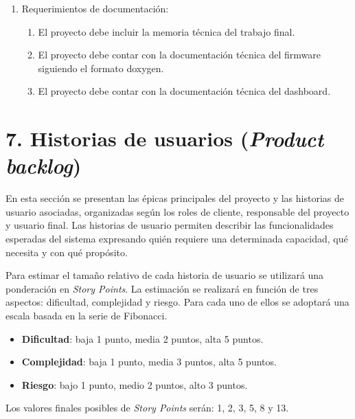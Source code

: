 \documentclass[
11pt, %
]{charter}
\begin{document}
\begin{enumerate}
	\item Requerimientos de documentación:
	\begin{enumerate}
		\item El proyecto debe incluir la memoria técnica del trabajo final.
		\item El proyecto debe contar con la documentación técnica del firmware siguiendo el formato doxygen.
		\item El proyecto debe contar con la documentación técnica del dashboard.
	\end{enumerate}
\end{enumerate}


\section{7. Historias de usuarios (\textit{Product backlog})}
\label{sec:backlog}

En esta sección se presentan las épicas principales del proyecto y las historias de usuario asociadas, organizadas según los roles de cliente, responsable del proyecto y usuario final. Las historias de usuario permiten describir las funcionalidades esperadas del sistema expresando quién requiere una determinada capacidad, qué necesita y con qué propósito.

Para estimar el tamaño relativo de cada historia de usuario se utilizará una ponderación en \textit{Story Points}. La estimación se realizará en función de tres aspectos: dificultad, complejidad y riesgo. Para cada uno de ellos se adoptará una escala basada en la serie de Fibonacci.

\begin{itemize}
	\item \textbf{Dificultad}: baja 1 punto, media 2 puntos, alta 5 puntos.
	\item \textbf{Complejidad}: baja 1 punto, media 3 puntos, alta 5 puntos.
	\item \textbf{Riesgo}: bajo 1 punto, medio 2 puntos, alto 3 puntos.
\end{itemize}

Los valores finales posibles de \textit{Story Points} serán: 1, 2, 3, 5, 8 y 13.
\end{document}
